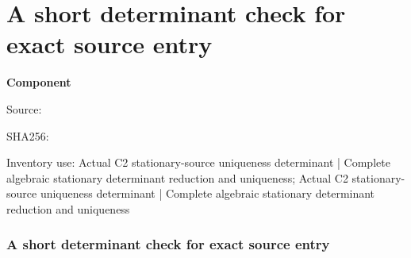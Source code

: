 \chapter{A short determinant check for exact source entry}
\label{component:p61209c7390b0}
\noindent\textbf{Component }\par
{\small\noindent Source: \par}
{\small\noindent SHA256: \par}
{\small\noindent Inventory use: Actual C2 stationary-source uniqueness determinant | Complete algebraic stationary determinant reduction and uniqueness; Actual C2 stationary-source uniqueness determinant | Complete algebraic stationary determinant reduction and uniqueness\par}
\medskip
\subsection{A short determinant check for exact source entry}
\label{p61209c7390b0:sec:c2-contact-determinant}

